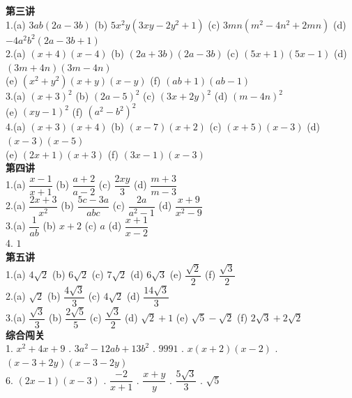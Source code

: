 \documentclass[a4paper,12pt]{ctexart}
\begin{document}
\textbf{第三讲}
\noindent\\
1.(a) $3ab(2a-3b)$ \quad (b) $5x^2y(3xy-2y^2+1)$ \quad (c) $3mn(m^2-4n^2+2mn)$ \quad (d) $-4a^2b^2(2a-3b+1)$\\
2.(a) $(x+4)(x-4)$ \quad (b) $(2a+3b)(2a-3b)$ \quad (c) $(5x+1)(5x-1)$ \quad (d) $(3m+4n)(3m-4n)$\\
(e) $(x^2+y^2)(x+y)(x-y)$ \quad (f) $(ab+1)(ab-1)$\\
3.(a) $(x+3)^2$ \quad (b) $(2a-5)^2$ \quad (c) $(3x+2y)^2$ \quad (d) $(m-4n)^2$\\
(e) $(xy-1)^2$ \quad (f) $(a^2-b^2)^2$\\
4.(a) $(x+3)(x+4)$ \quad (b) $(x-7)(x+2)$ \quad (c) $(x+5)(x-3)$ \quad (d) $(x-3)(x-5)$\\
(e) $(2x+1)(x+3)$ \quad (f) $(3x-1)(x-3)$\\

\textbf{第四讲}
\noindent\\
1.(a) $\dfrac{x-1}{x+1}$ \quad (b) $\dfrac{a+2}{a-2}$ \quad (c) $\dfrac{2xy}{3}$ \quad (d) $\dfrac{m+3}{m-3}$\\
2.(a) $\dfrac{2x+3}{x^2}$ \quad (b) $\dfrac{5c-3a}{abc}$ \quad (c) $\dfrac{2a}{a^2-1}$ \quad (d) $\dfrac{x+9}{x^2-9}$\\
3.(a) $\dfrac{1}{ab}$ \quad (b) $x+2$ \quad (c) $a$ \quad (d) $\dfrac{x+1}{x-2}$\\
4. $1$\\

\textbf{第五讲}
\noindent\\
1.(a) $4\sqrt2$ \quad (b) $6\sqrt2$ \quad (c) $7\sqrt2$ \quad (d) $6\sqrt3$ \quad (e) $\dfrac{\sqrt2}{2}$ \quad (f) $\dfrac{\sqrt3}{2}$\\
2.(a) $\sqrt2$ \quad (b) $\dfrac{4\sqrt3}{3}$ \quad (c) $4\sqrt2$ \quad (d) $\dfrac{14\sqrt3}{3}$\\
3.(a) $\dfrac{\sqrt3}{3}$ \quad (b) $\dfrac{2\sqrt5}{5}$ \quad (c) $\dfrac{\sqrt3}{2}$ \quad (d) $\sqrt2+1$ \quad (e) $\sqrt5-\sqrt2$ \quad (f) $2\sqrt3+2\sqrt2$\\

\textbf{综合闯关}
\noindent\\
1. $x^2+4x+9$ . $3a^2-12ab+13b^2$ . $9991$ . $x(x+2)(x-2)$ . $(x-3+2y)(x-3-2y)$\\
6. $(2x-1)(x-3)$ . $\dfrac{-2}{x+1}$ . $\dfrac{x+y}{y}$ . $\dfrac{5\sqrt3}{3}$ . $\sqrt5$
\end{document}
